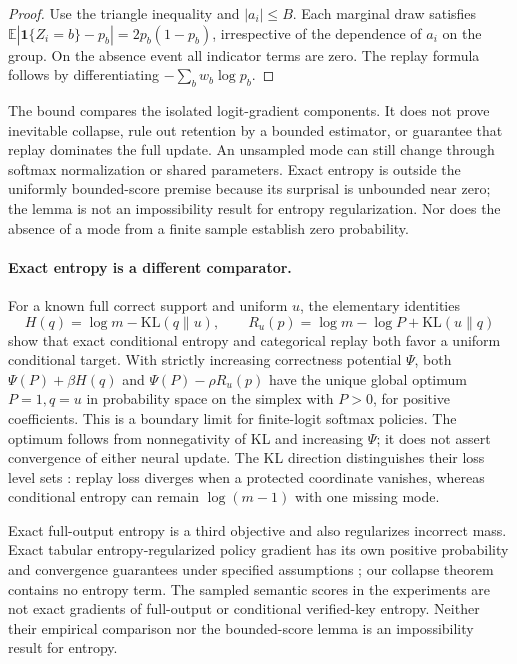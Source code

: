 \documentclass{article}
\newcommand{\enforcehalffinalproseline}{%
  \setlength{\parfillskip}{0pt plus .20\linewidth}}
\newcommand{\1}{\mathbf 1}
\newcommand{\E}{\mathbb E}
\theoremstyle{remark}
\theoremstyle{definition}
\theoremstyle{plain}
\begin{document}
\begin{proof}
\enforcehalffinalproseline
Use the triangle inequality and $|a_i|\le B$. Each marginal draw satisfies
$\E|\1\{Z_i=b\}-p_b|=2p_b(1-p_b)$, irrespective of the dependence of
$a_i$ on the group. On the absence event all indicator terms are zero.
The replay formula follows by differentiating $-\sum_b w_b\log p_b$.
\end{proof}

The bound compares the isolated logit-gradient components. It does not prove
inevitable collapse, rule out retention by a bounded estimator, or guarantee
that replay dominates the full update. An unsampled mode can still change
through softmax normalization or shared parameters. Exact entropy is outside
the uniformly bounded-score premise because its surprisal is unbounded near
zero; the lemma is not an impossibility result for entropy regularization.
Nor does the absence of a mode from a finite sample establish zero probability.

\paragraph{Exact entropy is a different comparator.}
For a known full correct support and uniform $u$, the elementary identities
\[
 H(q)=\log m-\mathrm{KL}(q\|u),\qquad
 R_u(p)=\log m-\log P+\mathrm{KL}(u\|q)
\]
show that exact conditional entropy and categorical replay both favor a
uniform conditional target. With strictly increasing correctness potential
$\Psi$, both $\Psi(P)+\beta H(q)$ and $\Psi(P)-\rho R_u(p)$ have the unique
global optimum $P=1,q=u$ in probability space on the simplex with $P>0$,
for positive coefficients. This is a boundary limit for finite-logit softmax
policies. The optimum follows from nonnegativity of KL and increasing
$\Psi$; it does not assert convergence of either neural update. The KL direction distinguishes their
loss level sets \citep{pereyra2017confidencepenalty,agarwal2021policygradient}:
replay loss diverges when a protected coordinate vanishes, whereas
conditional entropy can remain $\log(m-1)$ with one missing mode.

Exact full-output entropy is a third objective and also regularizes incorrect
mass. Exact tabular entropy-regularized policy gradient has its own positive
probability and convergence guarantees under specified assumptions
\citep{mei2020softmaxpg}; our collapse theorem contains no entropy term.
The sampled semantic scores in the experiments are not exact gradients of
full-output or conditional verified-key entropy. Neither their empirical
comparison nor the bounded-score lemma is an impossibility result for entropy.
\end{document}

